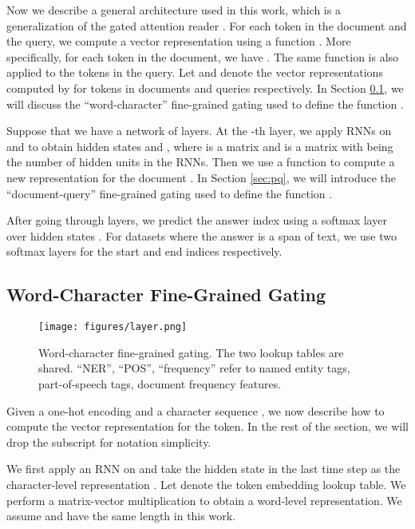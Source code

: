 \documentclass{article} \usepackage{iclr2017_conference,times}
\begin{document}
Now we describe a general architecture used in this work, which is a generalization of the gated attention reader \citep{dhingra2016gated}. For each token in the document and the query, we compute a vector representation using a function . More specifically, for each token  in the document, we have . The same function  is also applied to the tokens in the query. Let  and  denote the vector representations computed by  for tokens in documents and queries respectively. In Section \ref{sec:wc}, we will discuss the ``word-character'' fine-grained gating used to define the function . 

Suppose that we have a network of  layers. At the -th layer, we apply RNNs on  and  to obtain hidden states  and , where  is a  matrix and  is a  matrix with  being the number of hidden units in the RNNs. Then we use a function  to compute a new representation for the document . In Section \ref{sec:pq}, we will introduce the ``document-query'' fine-grained gating used to define the function .

After going through  layers, we predict the answer index  using a softmax layer over hidden states . For datasets where the answer is a span of text, we use two softmax layers for the start and end indices respectively.




\subsection{Word-Character Fine-Grained Gating} \label{sec:wc}

\begin{figure}[t]
\begin{center}
\texttt{[image: figures/layer.png]}
\end{center}
\caption{\small Word-character fine-grained gating. The two lookup tables are shared. ``NER'', ``POS'', ``frequency'' refer to named entity tags, part-of-speech tags, document frequency features.}
\label{fig:wc}
\end{figure}

Given a one-hot encoding  and a character sequence , we now describe how to compute the vector representation  for the token. In the rest of the section, we will drop the subscript  for notation simplicity.

We first apply an RNN on  and take the hidden state in the last time step  as the character-level representation \citep{yang2016multi}. Let  denote the token embedding lookup table. We perform a matrix-vector multiplication  to obtain a word-level representation. We assume  and  have the same length  in this work.
\end{document}
